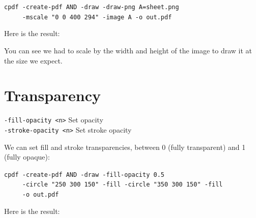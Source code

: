 \documentclass{book}
\begin{document}
\begin{framed}
 \noindent\small\verb?cpdf -create-pdf AND -draw -draw-png A=sheet.png?\\
 \noindent\small\verb?     -mscale "0 0 400 294" -image A -o out.pdf?
\end{framed}

\noindent Here is the result:

\bigskip
{}
\bigskip

\noindent You can see we had to scale by the width and height of the image to draw it at the size we expect.

\section{Transparency}
  {\small\begin{framed}
   \noindent\verb!-fill-opacity <n>! Set opacity\\
   \noindent\verb!-stroke-opacity <n>! Set stroke opacity
  \end{framed}}

We can set fill and stroke transparencies, between 0 (fully transparent) and 1 (fully opaque):

\begin{framed}
 \noindent\small\verb?cpdf -create-pdf AND -draw -fill-opacity 0.5?\\
 \noindent\small\verb?     -circle "250 300 150" -fill -circle "350 300 150" -fill?\\
 \noindent\small\verb?     -o out.pdf?
\end{framed}

\noindent Here is the result:

\bigskip
{}
\bigskip
\end{document}
